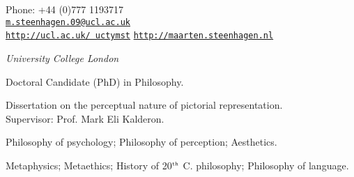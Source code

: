 \documentclass[11pt]{article}
\makeatletter
\def\myemail{m.steenhagen.09@ucl.ac.uk}
\def\myweb{http://ucl.ac.uk/\string~uctymst}
\def\myblog{http://maarten.steenhagen.nl}
\def\myphone{+44 (0)777 1193717}
\makeatother
\begin{document}
\begin{minipage}[t]{2.95in}
  
\end{minipage}
\hfill     
\hfill
\begin{minipage}[t]{1.7in}
  \flushright \footnotesize Phone: \myphone \\  
  {\scriptsize  \texttt{\href{mailto:\myemail}{\myemail}}} \\
  {\scriptsize  \texttt{\href{\myweb}{\myweb}}}
	{\scriptsize  \texttt{\href{\myblog}{\myblog}}}
\end{minipage}


\vfil

\reversemarginpar

\bigskip       

\medskip


\noindent\emph{University College London \vspace{0.01in}}

\ind Doctoral Candidate (PhD) in Philosophy.

\ind Dissertation on the perceptual nature of pictorial representation.\\ Supervisor: Prof. Mark Eli Kalderon.

\bigskip
\bigskip


\ind Philosophy of psychology; Philosophy of perception; Aesthetics.

\bigskip
\bigskip


\ind Metaphysics; Metaethics; History of 20$^{\textrm{\tiny{th}}}$ C. philosophy; Philosophy of language. 

\bigskip
\bigskip
\vfil 
{}
\end{document}
